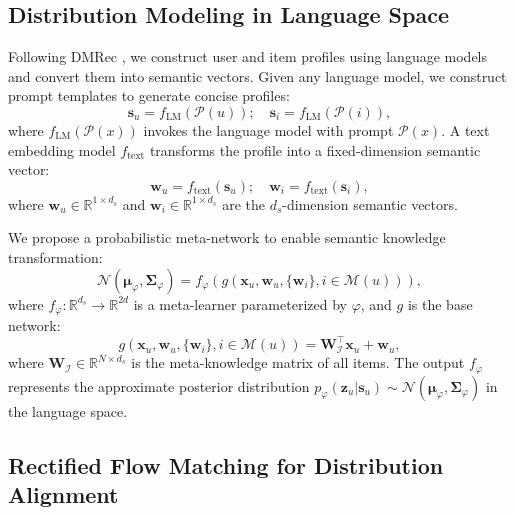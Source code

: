 \documentclass[sigconf]{acmart}
\begin{document}
\subsection{Distribution Modeling in Language Space}
Following DMRec \cite{zhang2024dmrec}, we construct user and item profiles using language models and convert them into semantic vectors. Given any language model, we construct prompt templates to generate concise profiles:
\begin{equation}
\label{prompt}
\mathbf s_u=f_{\text{LM}}(\mathcal P(u)); \quad \mathbf s_i=f_{\text{LM}}(\mathcal P(i)),
\end{equation}
where $f_{\text{LM}}(\mathcal P(x))$ invokes the language model with prompt $\mathcal P(x)$. A text embedding model $f_\text{text}$ \cite{su2023one} transforms the profile into a fixed-dimension semantic vector:
\begin{equation}
\label{text_embedding}
\mathbf w_u = f_\text{text}(\mathbf s_u); \quad \mathbf w_i=f_\text{text}(\mathbf s_i),
\end{equation}
where $\mathbf w_u \in \mathbb R^{1\times d_s}$ and $\mathbf w_i \in \mathbb R^{1\times d_s}$ are the $d_s$-dimension semantic vectors.

We propose a probabilistic meta-network to enable semantic knowledge transformation:
\begin{equation}
\label{language_p}
\mathcal N(\boldsymbol{\mu}_{\varphi}, \boldsymbol{\Sigma}_{\varphi}) = f_\varphi \left (g(\mathbf x_u, \mathbf w_u, \{\mathbf w_i\}, i \in \mathcal M(u))\right ),
\end{equation}
where $f_\varphi: \mathbb{R}^{d_s} \to \mathbb{R}^{2d}$ is a meta-learner parameterized by $\varphi$, and $g$ is the base network:
\begin{equation}
\label{meta_network}
g(\mathbf x_u, \mathbf w_u, \{\mathbf w_i\}, i \in \mathcal M(u))=\mathbf W_{\mathcal I}^\top \mathbf x_u + \mathbf w_u,
\end{equation}
where $\mathbf W_{\mathcal I} \in \mathbb R^{N \times d_s}$ is the meta-knowledge matrix of all items. The output $f_{\varphi}$ represents the approximate posterior distribution $p_{\varphi}(\mathbf z_u|\mathbf s_u) \sim \mathcal N(\boldsymbol{\mu}_{\varphi}, \boldsymbol{\Sigma}_{\varphi})$ in the language space.

\subsection{Rectified Flow Matching for Distribution Alignment}
\end{document}
